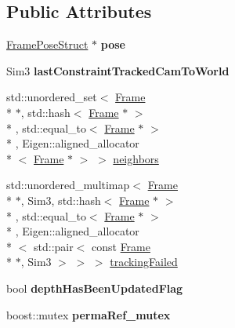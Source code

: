 \subsection*{Public Attributes}
\begin{DoxyCompactItemize}
\item 
\hypertarget{classlsd__slam_1_1_frame_a9e446e7abf6fc1e988594935dad9072b}{\hyperlink{classlsd__slam_1_1_frame_pose_struct}{Frame\-Pose\-Struct} $\ast$ {\bfseries pose}}\label{classlsd__slam_1_1_frame_a9e446e7abf6fc1e988594935dad9072b}

\item 
\hypertarget{classlsd__slam_1_1_frame_a013a9e6ef9bd7d72f46df32dbd261861}{Sim3 {\bfseries last\-Constraint\-Tracked\-Cam\-To\-World}}\label{classlsd__slam_1_1_frame_a013a9e6ef9bd7d72f46df32dbd261861}

\item 
std\-::unordered\-\_\-set$<$ \hyperlink{classlsd__slam_1_1_frame}{Frame} \\*
$\ast$, std\-::hash$<$ \hyperlink{classlsd__slam_1_1_frame}{Frame} $\ast$ $>$\\*
, std\-::equal\-\_\-to$<$ \hyperlink{classlsd__slam_1_1_frame}{Frame} $\ast$ $>$\\*
, Eigen\-::aligned\-\_\-allocator\\*
$<$ \hyperlink{classlsd__slam_1_1_frame}{Frame} $\ast$ $>$ $>$ \hyperlink{classlsd__slam_1_1_frame_ac0beb1665cd6caecfef8f6103203c147}{neighbors}
\item 
std\-::unordered\-\_\-multimap$<$ \hyperlink{classlsd__slam_1_1_frame}{Frame} \\*
$\ast$, Sim3, std\-::hash$<$ \hyperlink{classlsd__slam_1_1_frame}{Frame} $\ast$ $>$\\*
, std\-::equal\-\_\-to$<$ \hyperlink{classlsd__slam_1_1_frame}{Frame} $\ast$ $>$\\*
, Eigen\-::aligned\-\_\-allocator\\*
$<$ std\-::pair$<$ const \hyperlink{classlsd__slam_1_1_frame}{Frame} \\*
$\ast$, Sim3 $>$ $>$ $>$ \hyperlink{classlsd__slam_1_1_frame_a71811be54c6d349c9f13e50361b14718}{tracking\-Failed}
\item 
\hypertarget{classlsd__slam_1_1_frame_a2447e3447316b2803b20542e70e10785}{bool {\bfseries depth\-Has\-Been\-Updated\-Flag}}\label{classlsd__slam_1_1_frame_a2447e3447316b2803b20542e70e10785}

\item 
\hypertarget{classlsd__slam_1_1_frame_af05033d502e07e33f61908c7b0f6ea17}{boost\-::mutex {\bfseries perma\-Ref\-\_\-mutex}}\label{classlsd__slam_1_1_frame_af05033d502e07e33f61908c7b0f6ea17}


\end{DoxyCompactItemize}

